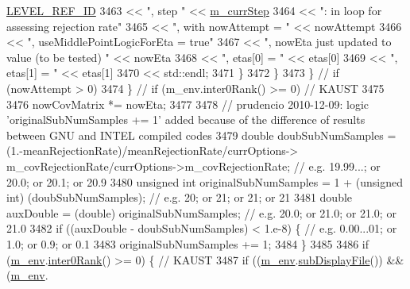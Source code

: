\begin{DoxyCode}
      \hyperlink{_m_l_sampling_level_options_8h_a68d15eaf394d210effcf584b938206d3}{LEVEL\_REF\_ID}
3463                                         << \textcolor{stringliteral}{", step "}  << \hyperlink{class_q_u_e_s_o_1_1_m_l_sampling_a1b1f8ccb4823bdfa26ec652f0807c63e}{m\_currStep}
3464                                         << \textcolor{stringliteral}{": in loop for assessing rejection rate"}
3465                                         << \textcolor{stringliteral}{", with nowAttempt = "} << nowAttempt
3466                                         << \textcolor{stringliteral}{", useMiddlePointLogicForEta = true"}
3467                                         << \textcolor{stringliteral}{", nowEta just updated to value (to be tested) "} << nowEta
3468                                         << \textcolor{stringliteral}{", etas[0] = "} << etas[0]
3469                                         << \textcolor{stringliteral}{", etas[1] = "} << etas[1]
3470                                         << std::endl;
3471               \}
3472             \}
3473           \} \textcolor{comment}{// if (nowAttempt > 0)}
3474         \} \textcolor{comment}{// if (m\_env.inter0Rank() >= 0) // KAUST}
3475 
3476         nowCovMatrix *= nowEta;
3477 
3478         \textcolor{comment}{// prudencio 2010-12-09: logic 'originalSubNumSamples += 1' added because of the difference of
       results between GNU and INTEL compiled codes}
3479         \textcolor{keywordtype}{double}       doubSubNumSamples     = (1.-meanRejectionRate)/meanRejectionRate/currOptions->
      m\_covRejectionRate/currOptions->m\_covRejectionRate; \textcolor{comment}{// e.g. 19.99...; or 20.0; or 20.1; or 20.9}
3480         \textcolor{keywordtype}{unsigned} \textcolor{keywordtype}{int} originalSubNumSamples = 1 + (\textcolor{keywordtype}{unsigned} \textcolor{keywordtype}{int}) (doubSubNumSamples); \textcolor{comment}{// e.g. 20; or 21; or
       21; or 21}
3481         \textcolor{keywordtype}{double}       auxDouble             = (double) originalSubNumSamples; \textcolor{comment}{// e.g. 20.0; or 21.0; or
       21.0; or 21.0}
3482         \textcolor{keywordflow}{if} ((auxDouble - doubSubNumSamples) < 1.e-8) \{ \textcolor{comment}{// e.g. 0.00...01; or 1.0; or 0.9; or 0.1}
3483           originalSubNumSamples += 1;
3484         \}
3485 
3486         \textcolor{keywordflow}{if} (\hyperlink{class_q_u_e_s_o_1_1_m_l_sampling_a13f1ca4fe9f94822fe572a743eaced1d}{m\_env}.\hyperlink{class_q_u_e_s_o_1_1_base_environment_ae106b5bb8a80b655b88b3a26b1e7c185}{inter0Rank}() >= 0) \{ \textcolor{comment}{// KAUST}
3487           \textcolor{keywordflow}{if} ((\hyperlink{class_q_u_e_s_o_1_1_m_l_sampling_a13f1ca4fe9f94822fe572a743eaced1d}{m\_env}.\hyperlink{class_q_u_e_s_o_1_1_base_environment_a8a0064746ae8dddfece4229b9ad374d6}{subDisplayFile}()) && (\hyperlink{class_q_u_e_s_o_1_1_m_l_sampling_a13f1ca4fe9f94822fe572a743eaced1d}{m\_env}.

\end{DoxyCode}

